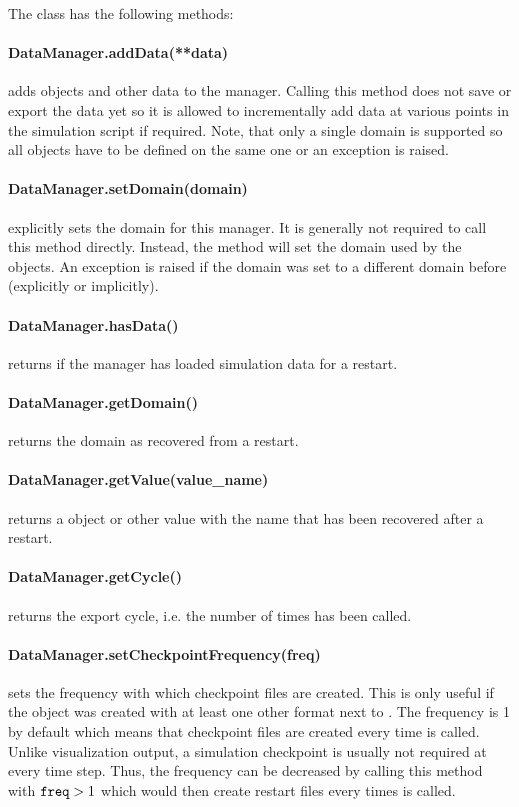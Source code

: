 \noindent The  class has the following methods:
\paragraph{DataManager.addData(**data)}
adds \Data objects and other data to the manager. Calling this method does
    not save or export the data yet so it is allowed to incrementally add data
    at various points in the simulation script if required.
    Note, that only a single domain is supported so all \Data objects have to
    be defined on the same one or an exception is raised.


\paragraph{DataManager.setDomain(domain)}
explicitly sets the domain for this manager.
    It is generally not required to call this method directly.
    Instead, the  method will set the domain used by the \Data
    objects.
    An exception is raised if the domain was set to a different domain before
    (explicitly or implicitly).


\paragraph{DataManager.hasData()}
returns \True if the manager has loaded simulation data for a restart.


\paragraph{DataManager.getDomain()}
returns the domain as recovered from a restart.


\paragraph{DataManager.getValue(value_name)}
returns a \Data object or other value with the name  that
    has been recovered after a restart.


\paragraph{DataManager.getCycle()}
returns the export cycle, i.e. the number of times  has been
    called.


\paragraph{DataManager.setCheckpointFrequency(freq)}
sets the frequency with which checkpoint files are created. This is only
    useful if the  object was created with at least one other
    format next to . The frequency is 1 by default which means
    that checkpoint files are created every time  is called.
    Unlike visualization output, a simulation checkpoint is usually not
    required at every time step. Thus, the frequency can be decreased by
    calling this method with $\texttt{freq}>1$ which would then create restart
    files every  times  is called.


